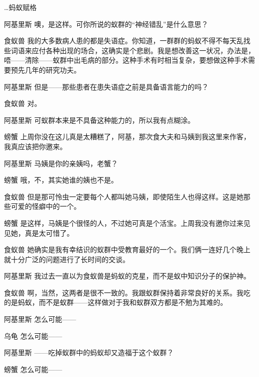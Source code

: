 \begin{dialog}{…蚂蚁赋格}
\begin{dialogue}
\item[阿基里斯]噢，是这样。可你所说的蚁群的“神经错乱”是什么意思？

\item[食蚁兽]我的大多数病人患的都是失语症。你知道，一群群的蚂蚁不得不每天乱找些词语来应付各种出现的场合，这确实是个悲剧。我是想改善这一状况，办法是，唔——清除——蚁群中出毛病的部分。这种手术有时相当复杂，要想做这种手术需要预先几年的研究功夫。

\item[阿基里斯]但是——那些患者在患失语症之前是具备语言能力的吗？

\item[食蚁兽]对。

\item[阿基里斯]可蚁群本来是不具备这种能力的，所以我有点糊涂。

\item[螃蟹]上周你没在这儿真是太糟糕了，阿基，那次食大夫和马姨到我这里来作客，我真应该把你邀来。

\item[阿基里斯]马姨是你的亲姨吗，老蟹？

\item[螃蟹]哦，不，其实她谁的姨也不是。

\item[食蚁兽]但是那可怜虫一定要每个人都叫她马姨，即使陌生人也得这样。这是她那些可爱的怪癖中的一个。

\item[螃蟹]是这样，马姨是个很怪的人，不过她可真是个活宝。上周我没有邀你过来见见她，真是太可惜了。

\item[食蚁兽]她确实是我有幸结识的蚁群中受教育最好的一个。我们俩一连好几个晚上就十分广泛的问题进行了长时间的交谈。

\item[阿基里斯]我过去一直以为食蚁兽是蚂蚁的克星，而不是蚁中知识分子的保护神。

\item[食蚁兽]啊，当然，这两者是很不一致的。我跟蚁群保持着非常良好的关系。我吃的是蚂蚁，而不是蚁群——这样做对于我和蚁群双方都是不勉为其难的。

\item[阿基里斯]怎么可能——

\item[乌龟]怎么可能——

\item[阿基里斯]——吃掉蚁群中的蚂蚁却又造福于这个蚁群？

\item[螃蟹]怎么可能——


\end{dialogue}
\end{dialog}
